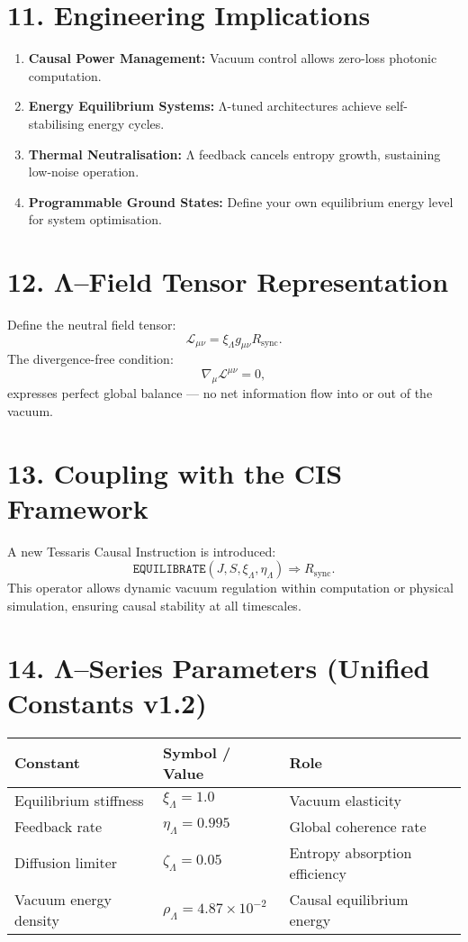 \documentclass[11pt,a4paper]{article}
\begin{document}
\section{11. Engineering Implications}
\begin{enumerate}
\item \textbf{Causal Power Management:} Vacuum control allows zero-loss photonic computation.  
\item \textbf{Energy Equilibrium Systems:} Λ-tuned architectures achieve self-stabilising energy cycles.  
\item \textbf{Thermal Neutralisation:} Λ feedback cancels entropy growth, sustaining low-noise operation.  
\item \textbf{Programmable Ground States:} Define your own equilibrium energy level for system optimisation.  
\end{enumerate}

\section{12. Λ–Field Tensor Representation}
Define the neutral field tensor:
\[
\mathcal{L}_{\mu\nu} = \xi_\Lambda g_{\mu\nu} R_{\mathrm{sync}}.
\]
The divergence-free condition:
\[
\nabla_\mu \mathcal{L}^{\mu\nu} = 0,
\]
expresses perfect global balance — no net information flow into or out of the vacuum.

\section{13. Coupling with the CIS Framework}
A new Tessaris Causal Instruction is introduced:
\[
\texttt{EQUILIBRATE}(J, S, \xi_\Lambda, \eta_\Lambda) \Rightarrow R_{\mathrm{sync}}.
\]
This operator allows dynamic vacuum regulation within computation or physical simulation, ensuring causal stability at all timescales.

\section{14. Λ–Series Parameters (Unified Constants v1.2)}
\begin{longtable}{|l|l|l|}
\hline
\textbf{Constant} & \textbf{Symbol / Value} & \textbf{Role} \\
\hline
Equilibrium stiffness & $\xi_\Lambda = 1.0$ & Vacuum elasticity \\
Feedback rate & $\eta_\Lambda = 0.995$ & Global coherence rate \\
Diffusion limiter & $\zeta_\Lambda = 0.05$ & Entropy absorption efficiency \\
Vacuum energy density & $\rho_\Lambda = 4.87\times10^{-2}$ & Causal equilibrium energy \\
\hline
\end{longtable}
\end{document}

